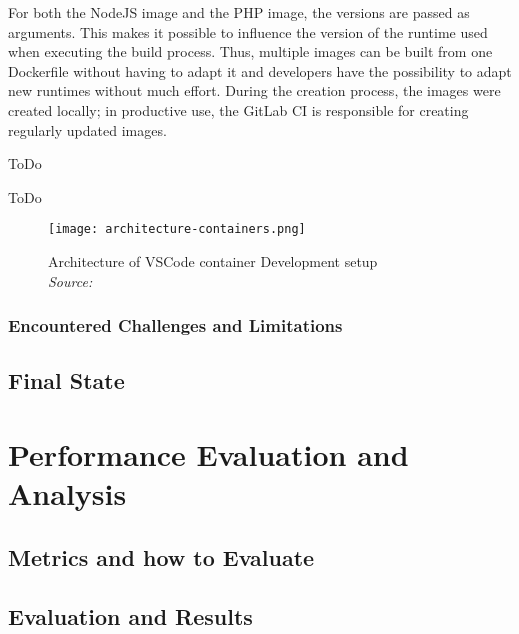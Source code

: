 \documentclass[12pt, a4paper]{article}
\begin{document}
        For both the NodeJS image and the PHP image, the versions are passed as arguments. This makes it possible to influence the version of the runtime used when executing the build process. Thus, multiple images can be built from one Dockerfile without having to adapt it and developers have the possibility to adapt new runtimes without much effort. During the creation process, the images were created locally; in productive use, the GitLab \ac{CI} is responsible for creating regularly updated images.
        
        ToDo
        
        ToDo

        \begin{figure}[]
            \centering
            \texttt{[image: architecture-containers.png]}
            \caption{Architecture of \ac{VSCode} container Development setup \\\textit{Source:~\cite{vscodedevcontainer}}}\label{fig::vscodecontainer}
        \end{figure}

        \subsubsection{Encountered Challenges and Limitations}
        \subsection{Final State}\label{sec::final}


\section{Performance Evaluation and Analysis}\label{sec::eval}
\subsection{Metrics and how to Evaluate}
\subsection{Evaluation and Results}
\end{document}
